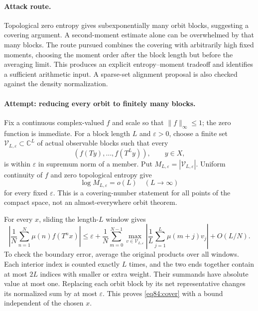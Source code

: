 \documentclass[11pt,a4paper]{article}
\numberwithin{equation}{section}
\newcommand{\C}{\mathbb{C}}
\begin{document}
\paragraph{Attack route.}
Topological zero entropy gives subexponentially many orbit blocks, suggesting
a covering argument. A second-moment estimate alone can be overwhelmed by
that many blocks. The route pursued combines the covering with arbitrarily
high fixed moments, choosing the moment order after the block length but
before the averaging limit. This produces an explicit entropy--moment
tradeoff and identifies a sufficient arithmetic input. A sparse-set
alignment proposal is also checked against the density normalization.

\paragraph{Attempt: reducing every orbit to finitely many blocks.}
Fix a continuous complex-valued $f$ and scale so that $\|f\|_\infty\leq1$;
the zero function is immediate. For a block length $L$ and $\varepsilon>0$,
choose a finite set $\mathcal V_{L,\varepsilon}\subset\C^L$ of actual
observable blocks such that every
\[
 (f(Ty),\ldots,f(T^Ly)),\qquad y\in X,
\]
is within $\varepsilon$ in supremum norm of a member. Put
$M_{L,\varepsilon}=|\mathcal V_{L,\varepsilon}|$.
Uniform continuity of $f$ and zero topological entropy give
\begin{equation}\label{eq84:entropy}
 \log M_{L,\varepsilon}=o(L)\quad(L\to\infty)
\end{equation}
for every fixed $\varepsilon$. This is a covering-number statement for all
points of the compact space, not an almost-everywhere orbit theorem.

For every $x$, sliding the length-$L$ window gives
\begin{equation}\label{eq84:cover}
 \left|\frac1N\sum_{n=1}^N\mu(n)f(T^nx)\right|
 \leq\varepsilon+
 \frac1N\sum_{m=0}^{N-1}\max_{v\in\mathcal V_{L,\varepsilon}}
       \left|\frac1L\sum_{j=1}^L\mu(m+j)v_j\right|
       +O(L/N).
\end{equation}
To check the boundary error, average the original products over all windows.
Each interior index is counted exactly $L$ times, and the two ends together
contain at most $2L$ indices with smaller or extra weight. Their summands
have absolute value at most one. Replacing each orbit block by its net
representative changes its normalized sum by at most $\varepsilon$.
This proves \eqref{eq84:cover} with a bound independent of the chosen $x$.
\end{document}
